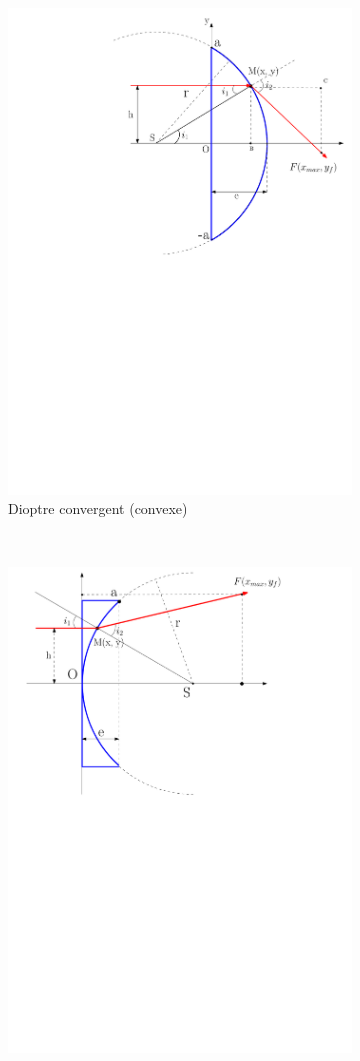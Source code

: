 \documentclass[a4paper, 11pt]{article}
\begin{document}
\begin{figure}[H]
    \centering
    \begin{subfigure}[t]{0.45\linewidth}
    	\centering
		\includegraphics[width=0.8\linewidth]{Figures/schema_lent_conv.pdf}
		\caption{Dioptre convergent (convexe)}
		\label{fig:schema_lent_conv} 
    \end{subfigure}
    ~
    \begin{subfigure}[t]{0.45\linewidth}
    	\centering
		\includegraphics[width=0.8\linewidth]{Figures/schema_lent_div.pdf}

\end{subfigure}
\end{figure}
\end{document}
